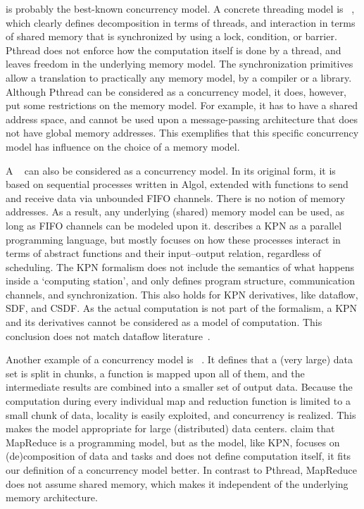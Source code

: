  is probably the best-known concurrency model.
A concrete threading model is ~\cite{Pthread}, which clearly defines decomposition in terms of threads, and interaction in terms of shared memory that is synchronized by using a lock, condition, or barrier.
Pthread does not enforce how the computation itself is done by a thread, and leaves freedom in the underlying memory model.
The synchronization primitives allow a translation to practically any memory model, by a compiler or a library.
Although Pthread can be considered as a concurrency model, it does, however, put some restrictions on the memory model.
For example, it has to have a shared address space, and cannot be used upon a message-passing architecture that does not have global memory addresses.
This exemplifies that this specific concurrency model has influence on the choice of a memory model.

A ~\cite{kahn:kpn} can also be considered as a concurrency model.
In its original form, it is based on sequential processes written in Algol, extended with functions to send and receive data via unbounded \ac{FIFO} channels.
There is no notion of memory addresses.
As a result, any underlying (shared) memory model can be used, as long as \ac{FIFO} channels can be modeled upon it.
 describes a \ac{KPN} as a parallel programming language, but mostly focuses on how these processes interact in terms of abstract functions and their input--output relation, regardless of scheduling.
The \ac{KPN} formalism does not include the semantics of what happens inside a `computing station', and only defines program structure, communication channels, and synchronization.
This also holds for \ac{KPN} derivatives, like dataflow, \acs{SDF}, and \acs{CSDF}.
As the actual computation is not part of the formalism, a \ac{KPN} and its derivatives cannot be considered as a model of computation.
This conclusion does not match dataflow literature~\cite{lee:dataflow}.

Another example of a concurrency model is ~\cite{dean:map_reduce}.
It defines that a (very large) data set is split in chunks, a function is mapped upon all of them, and the intermediate results are combined into a smaller set of output data.
Because the computation during every individual map and reduction function is limited to a small chunk of data, locality is easily exploited, and concurrency is realized.
This makes the model appropriate for large (distributed) data centers.
 claim that MapReduce is a programming model, but as the model, like \ac{KPN}, focuses on (de)composition of data and tasks and does not define computation itself, it fits our definition of a concurrency model better.
In contrast to Pthread, MapReduce does not assume shared memory, which makes it independent of the underlying memory architecture.


